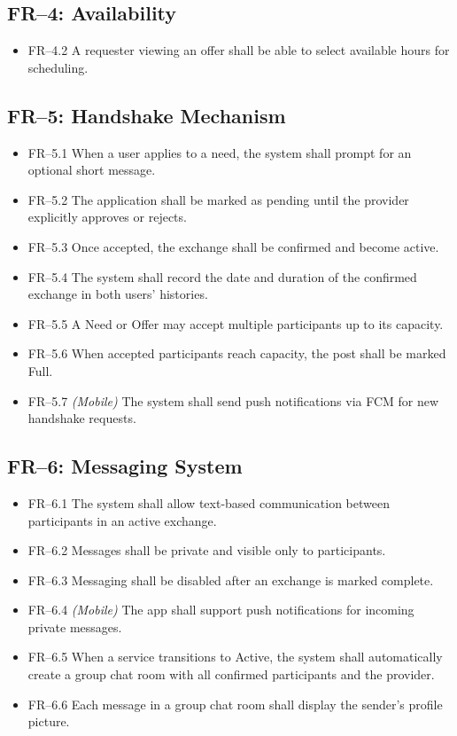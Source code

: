 \documentclass[10pt,a4paper]{report}
\begin{document}
\subsection{FR--4: Availability}
\begin{itemize}
    \item FR--4.2 A requester viewing an offer shall be able to select available hours for scheduling.
\end{itemize}

\subsection{FR--5: Handshake Mechanism}
\begin{itemize}
    \item FR--5.1 When a user applies to a need, the system shall prompt for an optional short message.
    \item FR--5.2 The application shall be marked as pending until the provider explicitly approves or rejects.
    \item FR--5.3 Once accepted, the exchange shall be confirmed and become active.
    \item FR--5.4 The system shall record the date and duration of the confirmed exchange in both users' histories.
    \item FR--5.5 A Need or Offer may accept multiple participants up to its capacity.
    \item FR--5.6 When accepted participants reach capacity, the post shall be marked Full.
    \item FR--5.7 \textit{(Mobile)} The system shall send push notifications via FCM for new handshake requests.
\end{itemize}

\subsection{FR--6: Messaging System}
\begin{itemize}
    \item FR--6.1 The system shall allow text-based communication between participants in an active exchange.
    \item FR--6.2 Messages shall be private and visible only to participants.
    \item FR--6.3 Messaging shall be disabled after an exchange is marked complete.
    \item FR--6.4 \textit{(Mobile)} The app shall support push notifications for incoming private messages.
    \item FR--6.5 When a service transitions to Active, the system shall automatically create a group chat room with all confirmed participants and the provider.
    \item FR--6.6 Each message in a group chat room shall display the sender's profile picture.
\end{itemize}
\end{document}
